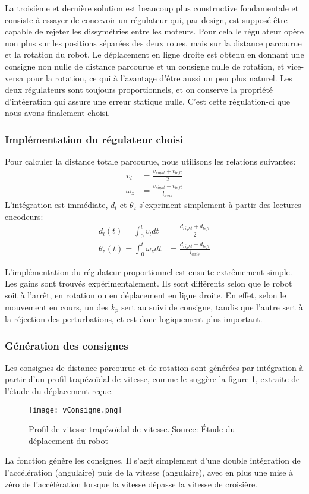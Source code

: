 La troisième et dernière solution est beaucoup plus constructive fondamentale et consiste à essayer de concevoir un régulateur qui, par design, est supposé être capable de rejeter les dissymétries entre les moteurs. Pour cela le régulateur opère non plus sur les positions séparées des deux roues, mais sur la distance parcourue et la rotation du robot. Le déplacement en ligne droite est obtenu en donnant une consigne non nulle de distance parcourue et un consigne nulle de rotation, et vice-versa pour la rotation, ce qui à l'avantage d'être aussi un peu plus naturel. Les deux régulateurs sont toujours proportionnels, et on conserve la propriété d'intégration qui assure une erreur statique nulle. C'est cette régulation-ci que nous avons finalement choisi.

\subsubsection{Implémentation du régulateur choisi}
Pour calculer la distance totale parcourue, nous utilisons les relations suivantes:
\begin{align*}
  v_l &= \frac{v_{right}+v_{left}}{2}\\
  \omega_z &= \frac{v_{right} - v_{left}}{l_{axis}}
\end{align*}
L'intégration est immédiate, $d_l$ et $\theta_z$ s'expriment simplement à partir des lectures encodeurs:
\begin{align*}
  d_l(t) = \int_0^tv_l dt &= \frac{d_{right}+d_{left}}{2}\\
  \theta_z(t) = \int_0^t \omega_z dt &= \frac{d_{right} - d_{left}}{l_{axis}}
\end{align*}

L'implémentation du régulateur proportionnel est ensuite extrêmement simple. Les gains sont trouvés expérimentalement. Ils sont différents selon que le robot soit à l'arrêt, en rotation ou en déplacement en ligne droite. En effet, selon le mouvement en cours, un des $k_p$ sert au suivi de consigne, tandis que l'autre sert à la réjection des perturbations, et est donc logiquement plus important.

\subsubsection{Génération des consignes}
Les consignes de distance parcourue et de rotation sont générées par intégration à partir d'un profil trapézoïdal de vitesse, comme le suggère la figure \ref{fig:vConsigne}, extraite de l'étude du déplacement reçue.
\begin{figure}[htbp]
  \centering
  \texttt{[image: vConsigne.png]}
  \caption{Profil de vitesse trapézoïdal de vitesse.[Source: \'Etude du déplacement du robot]\label{fig:vConsigne}}
\end{figure}
La fonction  génère les consignes. Il s'agit simplement d'une double intégration de l'accélération (angulaire) puis de la vitesse (angulaire), avec en plus une mise à zéro de l'accélération lorsque la vitesse dépasse la vitesse de croisière.

